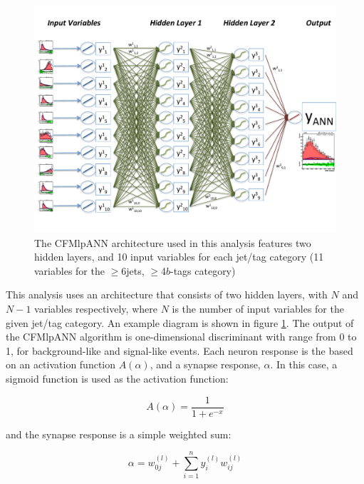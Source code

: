 \begin{figure}[hbtp]
 \begin{center}
   \includegraphics[width=1.0\textwidth]{Figures/Analysis_1_Diagrams/CFMlpANN_Architecture.pdf}
   \caption{The CFMlpANN architecture used in this analysis features
     two hidden layers, and 10 input variables for each jet/tag
     category (11 variables for the $\ge$6jets, $\ge$4$b$-tags
     category)}
   \label{fig:cfmlpann_arch}
 \end{center}
\end{figure}

\par This analysis uses an architecture that consists of two hidden
layers, with $N$ and $N-1$ variables respectively, where $N$ is the
number of input variables for the given jet/tag category.  An example
diagram is shown in figure \ref{fig:cfmlpann_arch}.  The output of the
CFMlpANN algorithm is one-dimensional discriminant with range from 0
to 1, for background-like and signal-like events.  Each neuron
response is the based on an activation function $A(\alpha)$, and a synapse
response, $\alpha$.  In this case, a sigmoid function is used as
the activation function:

\begin{equation}\label{eq:sigmoid}
A(\alpha) = \frac{1}{1+e^{-x}}
\end{equation}

\noindent and the synapse response is a simple weighted sum:

\begin{equation}\label{eq:ann_synapse}
\alpha = w_{0j}^{(l)} + \sum_{i=1}^{n}y_{i}^{(l)}w_{ij}^{(l)} 
\end{equation}

